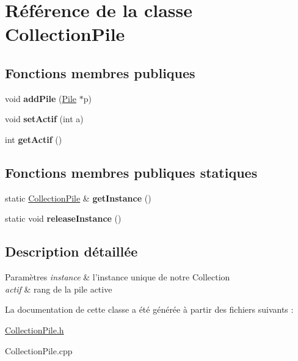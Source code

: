 \hypertarget{class_collection_pile}{\section{Référence de la classe Collection\-Pile}
\label{class_collection_pile}
}
\subsection*{Fonctions membres publiques}
\begin{DoxyCompactItemize}
\item 
\hypertarget{class_collection_pile_ab6c67317876c4b74548d5459d61bfaff}{void {\bfseries add\-Pile} (\hyperlink{class_pile}{Pile} $\ast$p)}\label{class_collection_pile_ab6c67317876c4b74548d5459d61bfaff}

\item 
\hypertarget{class_collection_pile_a6685a7063ffe1a8951aed57042f8fe31}{void {\bfseries set\-Actif} (int a)}\label{class_collection_pile_a6685a7063ffe1a8951aed57042f8fe31}

\item 
\hypertarget{class_collection_pile_a265a8d02d0c37f99ca0d2df20fcc2b3f}{int {\bfseries get\-Actif} ()}\label{class_collection_pile_a265a8d02d0c37f99ca0d2df20fcc2b3f}

\end{DoxyCompactItemize}
\subsection*{Fonctions membres publiques statiques}
\begin{DoxyCompactItemize}
\item 
\hypertarget{class_collection_pile_af542ecfe521b494bb9596f586784ee3a}{static \hyperlink{class_collection_pile}{Collection\-Pile} \& {\bfseries get\-Instance} ()}\label{class_collection_pile_af542ecfe521b494bb9596f586784ee3a}

\item 
\hypertarget{class_collection_pile_a4dec5876d1013bd2163fa579b5558285}{static void {\bfseries release\-Instance} ()}\label{class_collection_pile_a4dec5876d1013bd2163fa579b5558285}

\end{DoxyCompactItemize}


\subsection{Description détaillée}

\begin{DoxyParams}{Paramètres}
{\em instance} & l'instance unique de notre Collection \\
\hline
{\em actif} & rang de la pile active \\
\hline
\end{DoxyParams}


La documentation de cette classe a été générée à partir des fichiers suivants \-:\begin{DoxyCompactItemize}
\item 
\hyperlink{_collection_pile_8h}{Collection\-Pile.\-h}\item 
Collection\-Pile.\-cpp\end{DoxyCompactItemize}
